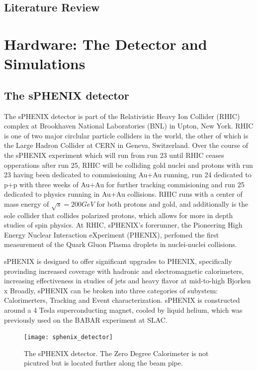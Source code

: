 \documentclass[letterpaper, 12pt, oneside]{book}
\theoremstyle{definition}
\begin{document}
\frontmatter

\setcounter{page}{2}





\tableofcontents
\listoftables
\listoffigures

\mainmatter
\chapter{Literature Review}
\label{ch:LR}
 
\part{Hardware: The Detector and Simulations}
\chapter{The sPHENIX detector}
The sPHENIX detector is part of the Relativistic Heavy Ion Collider (RHIC) complex at Brookhaven National Laboratories (BNL) in Upton, New York. 
RHIC is one of two major circlular particle colliders in the world, the other of which is the Large Hadron Collider at CERN in Geneva, Switzerland. 
Over the course of the sPHENIX experiment which will run from run 23 until RHIC ceases opperations after run 25, RHIC will be colliding gold nuclei and protons with run 23 having been dedicated to commissioning Au+Au running, 
run 24 dedicated to p+p with three weeks of Au+Au for further tracking commisioning and run 25 dedicated to physics running in Au+Au collisions. 
RHIC runs with a center of mass energy of $\sqrt{s} = 200 GeV$ for both protons and gold, and additionally is the sole collider that collides polarized protons, which allows for more in depth studies of spin physics. 
At RHIC, sPHENIX's forerunner, the Pioneering High Energy Nuclear Interaction eXperiment (PHENIX), perfomed the first measurement of the Quark Gluon Plasma droplets \cite{QGP_droplets} in nuclei-nuclei collisions. 

sPHENIX is designed to offer significant upgrades to PHENIX, specifically provinding increased coverage with hadronic and electromagnetic calorimeters, increasing effectiveness in studies of jets and heavy flavor at mid-to-high Bjorken x \cite{sPHENIX_TDR}\cite{sPHENIX_whitepaper}\cite{sPHENIX_physics_goals}
Broadly, sPHENIX can be broken into three categories of subystem: Calorimerters, Tracking and Event characterization.
sPHENIX is constructed around a 4 Tesla superconducting magnet, cooled by liquid helium, which was previously used on the BABAR experiment at SLAC. 
\begin{figure}
	\texttt{[image: sphenix\_detector]}
	\caption{The sPHENIX detector. The Zero Degree Calorimeter is not picutred but is located further along the beam pipe.}
	\label{fig:sphenix_detector}
\end{figure}
\end{document}
